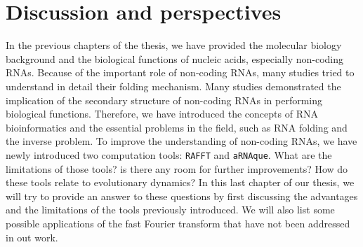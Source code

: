 \chapter{Discussion and perspectives}\label{ch:continuity}

In the previous chapters of the thesis, we have provided the molecular biology background and the biological functions of nucleic acids, especially non-coding RNAs. Because of the important role of non-coding RNAs, many studies tried to understand in detail their folding mechanism. Many studies demonstrated the implication of the secondary structure of non-coding RNAs in performing biological functions. Therefore, we have introduced the concepts of RNA bioinformatics and the essential problems in the field, such as RNA folding and the inverse problem. To improve the understanding of non-coding RNAs, we have newly introduced two computation tools: \texttt{RAFFT} and \texttt{aRNAque}. What are the limitations of those tools? is there any room for further improvements? How do these tools relate to evolutionary dynamics? In this last chapter of our thesis, we will try to provide an answer to these questions by first discussing the advantages and the limitations  of the tools previously introduced. We will also list some possible applications of the fast Fourier transform that have not been addressed in out work. 

